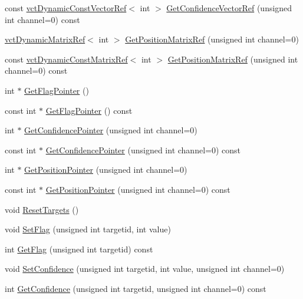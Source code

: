 \begin{DoxyCompactItemize}
const \hyperlink{classvct_dynamic_const_vector_ref}{vct\+Dynamic\+Const\+Vector\+Ref}$<$ int $>$ \hyperlink{classsvl_sample_targets_a3236346e68eab08a762efbcf0e0350b8}{Get\+Confidence\+Vector\+Ref} (unsigned int channel=0) const 
\item 
\hyperlink{classvct_dynamic_matrix_ref}{vct\+Dynamic\+Matrix\+Ref}$<$ int $>$ \hyperlink{classsvl_sample_targets_a8b8d9ccac7265de45c308dbbfc1eb757}{Get\+Position\+Matrix\+Ref} (unsigned int channel=0)
\item 
const \hyperlink{classvct_dynamic_const_matrix_ref}{vct\+Dynamic\+Const\+Matrix\+Ref}$<$ int $>$ \hyperlink{classsvl_sample_targets_a9a77f72f0df2318ecb9aa9b2968c354a}{Get\+Position\+Matrix\+Ref} (unsigned int channel=0) const 
\item 
int $\ast$ \hyperlink{classsvl_sample_targets_a509bb541dd2840e20840ec4911ba1cb1}{Get\+Flag\+Pointer} ()
\item 
const int $\ast$ \hyperlink{classsvl_sample_targets_a3ad17166082ba970af9dd8313e63c827}{Get\+Flag\+Pointer} () const 
\item 
int $\ast$ \hyperlink{classsvl_sample_targets_a67205065691030b0e9c71aa025bc8141}{Get\+Confidence\+Pointer} (unsigned int channel=0)
\item 
const int $\ast$ \hyperlink{classsvl_sample_targets_a9a135aafd97bc84c10b85619dcbea7fc}{Get\+Confidence\+Pointer} (unsigned int channel=0) const 
\item 
int $\ast$ \hyperlink{classsvl_sample_targets_ad830943cfaba38deeb2b208bfd2826a7}{Get\+Position\+Pointer} (unsigned int channel=0)
\item 
const int $\ast$ \hyperlink{classsvl_sample_targets_ae976f2dfc186374e7a25d592a3c58037}{Get\+Position\+Pointer} (unsigned int channel=0) const 
\item 
void \hyperlink{classsvl_sample_targets_a5a552abb25e9e49a006b46cfba856610}{Reset\+Targets} ()
\item 
void \hyperlink{classsvl_sample_targets_a71356a8ccd8914048eda4db73c70e5bb}{Set\+Flag} (unsigned int targetid, int value)
\item 
int \hyperlink{classsvl_sample_targets_ad04b0134904188c5798bdac2e941b3a6}{Get\+Flag} (unsigned int targetid) const 
\item 
void \hyperlink{classsvl_sample_targets_a164f27c75f7495c69b21a0aebe113296}{Set\+Confidence} (unsigned int targetid, int value, unsigned int channel=0)
\item 
int \hyperlink{classsvl_sample_targets_ab2853c47b0768157de97609c59c23d32}{Get\+Confidence} (unsigned int targetid, unsigned int channel=0) const 

\end{DoxyCompactItemize}
